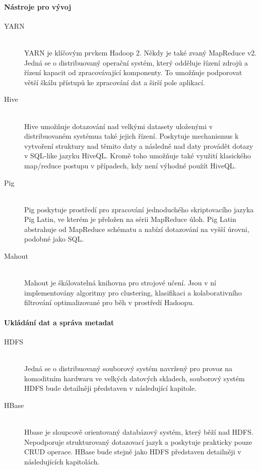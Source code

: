 \documentclass[thesis=M,czech]{FITthesis}[2012/06/26]
\begin{document}
\paragraph{Nástroje pro vývoj}
\begin{description}
\item[YARN] \hfill \\
YARN je klíčovým prvkem Hadoop 2. Někdy je také zvaný  MapReduce v2. Jedná se o distribuovaný operační systém, který odděluje řízení zdrojů a řízení kapacit od zpracovávající komponenty. To umožňuje  podporovat větší škálu přístupů ke zpracování dat a širší pole aplikací.

\item[Hive] \hfill \\
Hive umožňuje dotazování nad velkými datasety uloženými v distribuovaném systémua také jejich řízení. Poskytuje mechanismus k vytvoření struktury nad těmito daty a následně nad daty provádět dotazy v SQL-like  jazyku HiveQL. Kromě toho umožňuje také využití klasického map/reduce postupu v případech, kdy není výhodné použít HiveQL. 

\item[Pig] \hfill \\
Pig poskytuje prostředí pro zpracování jednoduchého skriptovacího jazyka Pig Latin, ve kterém je přeložen na sérii MapReduce úloh. Pig Latin abstrahuje od MapReduce schématu a nabízí dotazování na vyšší úrovni, podobné jako SQL.

\item[Mahout] \hfill \\
Mahout je škálovatelná knihovna pro strojové učení. Jsou v ní implementovány algoritmy pro clustering, klasifikaci a kolaborativního filtrování optimalizované pro běh v prostředí Hadoopu.
\end{description}
\paragraph{Ukládání dat a správa metadat}
\begin{description}
\item[HDFS] \hfill \\
Jedná se o distribuovaný souborový systém navržený  pro provoz na komoditním hardwaru ve velkých datových skladech, souborový systém HDFS bude detailněji představen v následující kapitole.

\item[HBase] \hfill \\
Hbase je sloupcově orientovaný databázový systém, který běží nad HDFS. Nepodporuje strukturovaný dotazovací jazyk a poskytuje prakticky pouze CRUD operace. HBase bude stejně jako HDFS představen detailněji v následujících kapitolách.
\end{description}
\end{document}

